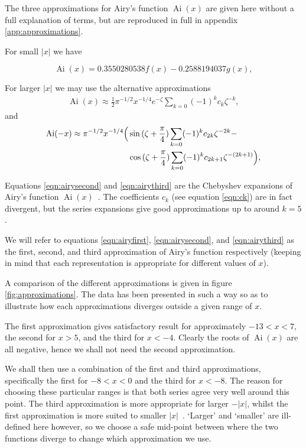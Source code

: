 \documentclass[]{article}
\renewcommand{\mod}[1]{\ensuremath{\lvert {#1} \rvert}}
\newcommand{\Ai}[1]{\ensuremath{\operatorname{Ai}({#1})}}
\begin{document}
The three approximations for Airy's function $\Ai{x}$ are given here without a full explanation of terms, but are reproduced in full in appendix \ref{app:approximations}.

For small $\mod{x}$ we have~\cite{ref:abramowitz}

\begin{equation}\label{eqn:airyfirst}
\Ai{x} = 0.3550280538f(x) - 0.2588194037g(x),
\end{equation}

For larger $\mod{x}$ we may use the alternative approximations
\begin{align}\label{eqn:airysecond}
\Ai{x} \approx \frac{1}{2}\pi^{-1/2}x^{-1/4}e^{-\zeta} \sum\limits_{k=0} (-1)^{k}c_{k}\zeta^{-k},
\end{align}
and
\begin{equation}\label{eqn:airythird}
	\begin{split}
		\Ai{-x} \approx \pi^{-1/2}x^{-1/4}
		\Bigl(
			&\sin{(\zeta + \frac{\pi}{4})}\sum\limits_{k=0}(-1)^{k}c_{2k}\zeta^{-2k} -\\
			&\cos{(\zeta + \frac{\pi}{4})}\sum\limits_{k=0}(-1)^{k}c_{2k+1}\zeta^{-(2k+1)}
		\Bigr),
	\end{split}
\end{equation}

Equations \ref{eqn:airysecond} and \ref{eqn:airythird} are the Chebyshev expansions of Airy's function $\Ai{x}$~\cite{ref:agil}. The coefficients $c_{k}$ (see equation \ref{eqn:ck}) are in fact divergent, but the series expansions give good approximations up to around $k = 5$.

We will refer to equations \ref{eqn:airyfirst}, \ref{eqn:airysecond}, and \ref{eqn:airythird} as the first, second, and third approximation of Airy's function respectively (keeping in mind that each representation is appropriate for different values of $x$).

A comparison of the different approximations is given in figure \ref{fig:approximations}. The data has been presented in such a way so as to illustrate how each approximations diverges outside a given range of $x$.

The first approximation gives satisfactory result for approximately $-13 < x < 7$, the second for $x > 5$, and the third for $x < -4$. Clearly the roots of \Ai{x} are all negative, hence we shall not need the second approximation.

We shall then use a combination of the first and third approximations, specifically the first for $-8 < x < 0$ and the third for $x < -8$. The reason for choosing these particular ranges is that both series agree very well around this point. The third approximation is more appropriate for larger $-\mod{x}$, whilst the first approximation is more suited to smaller $\mod{x}$~\cite{ref:gdaniell}. `Larger' and `smaller' are ill-defined here however, so we choose a safe mid-point between where the two functions diverge to change which approximation we use.
\end{document}
